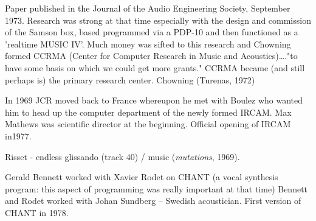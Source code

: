 Paper published in the Journal of the Audio Engineering Society, September 1973. Research was strong at that time especially with the design and commission of the Samson box, based programmed via a PDP-10 and then functioned as a 'realtime MUSIC IV'. Much money was sifted to this research and Chowning formed CCRMA (Center for Computer Research in Music and Acoustics)…."to have some basis on which we could get more grants." CCRMA became (and still perhaps is) the primary research center. Chowning (Turenas, 1972)

In 1969 JCR moved back to France whereupon he met with Boulez who wanted him to head up the computer department of the newly formed IRCAM. Max Mathews was scientific director at the beginning. Official opening of IRCAM in1977.

Risset - endless glissando (track 40) / music (\textit{mutations}, 1969).

Gerald Bennett worked with Xavier Rodet on CHANT (a vocal synthesis program: this aspect of programming was really important at that time) Bennett and Rodet worked with Johan Sundberg – Swedish acoustician.  First version of CHANT in 1978.


